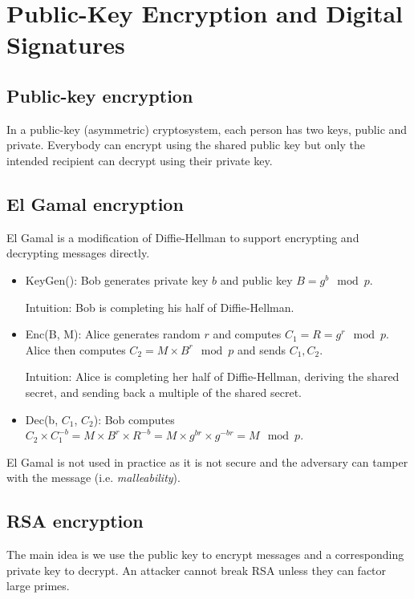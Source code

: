 \chapter{Public-Key Encryption and Digital Signatures}

\section{Public-key encryption}
In a public-key (asymmetric) cryptosystem, each person has two keys, public and private. Everybody can encrypt using the shared public key but only the intended recipient can decrypt using their private key.

\section{El Gamal encryption}
El Gamal is a modification of Diffie-Hellman to support encrypting and decrypting messages directly.
\begin{itemize}
    \item KeyGen(): Bob generates private key $b$ and public key $B = g^b \mod p$.
    
    Intuition: Bob is completing his half of Diffie-Hellman.
    
    \item Enc(B, M): Alice generates random $r$ and computes $C_1 = R = g^r \mod p$. Alice then computes $C_2 = M \times B^r \mod p$ and sends $C_1, C_2$.
    
    Intuition: Alice is completing her half of Diffie-Hellman, deriving the shared secret, and sending back a multiple of the shared secret.
    
    \item Dec(b, $C_1$, $C_2$): Bob computes $C_2 \times C_1^{-b} = M \times B^r \times R^{-b} = M \times g^{br} \times g^{-br} = M \mod p$.
\end{itemize}

\medskip

El Gamal is not used in practice as it is not secure and the adversary can tamper with the message (i.e. \emph{malleability}).

\section{RSA encryption}
The main idea is we use the public key to encrypt messages and a corresponding private key to decrypt. An attacker cannot break RSA unless they can factor large primes.

